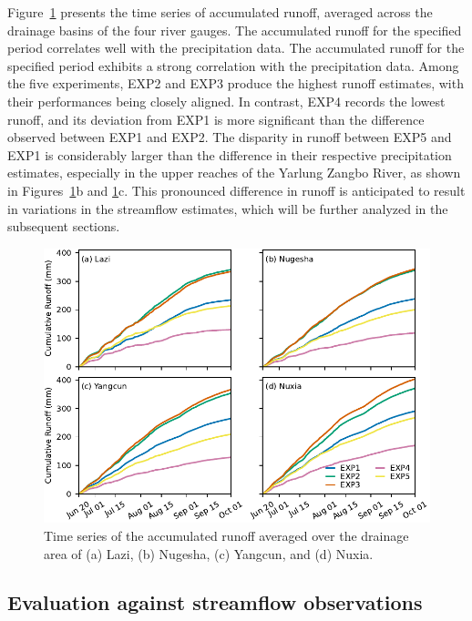 \documentclass[draft]{agujournal2019}
\begin{document}
Figure~\ref{fig:rncumupts} presents the time series of accumulated runoff, averaged across the drainage basins of the four river gauges. The accumulated runoff for the specified period correlates well with the precipitation data. The accumulated runoff for the specified period exhibits a strong correlation with the precipitation data. Among the five experiments, EXP2 and EXP3 produce the highest runoff estimates, with their performances being closely aligned. In contrast, EXP4 records the lowest runoff, and its deviation from EXP1 is more significant than the difference observed between EXP1 and EXP2. The disparity in runoff between EXP5 and EXP1 is considerably larger than the difference in their respective precipitation estimates, especially in the upper reaches of the Yarlung Zangbo River, as shown in Figures~\ref{fig:rncumupts}b and \ref{fig:rncumupts}c. This pronounced difference in runoff is anticipated to result in variations in the streamflow estimates, which will be further analyzed in the subsequent sections.

\begin{figure}[h!]
  \centering
  \noindent\includegraphics[width=140mm]{prrn_rncumupts.pdf}
  \caption{Time series of the accumulated runoff averaged over the drainage area of (a) Lazi, (b) Nugesha, (c) Yangcun, and (d) Nuxia.}\label{fig:rncumupts}
\end{figure}

\subsection{Evaluation against streamflow observations}
\end{document}
